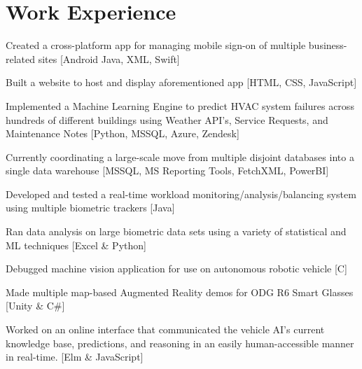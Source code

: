 \documentclass[letterpaper]{headers} %
\begin{document}
\begin{minipage}[t]{0.66\textwidth}

\section{Work Experience}

	\vspace{\topsep}
	\begin{tightitemize}
		\item Created a cross-platform app for managing mobile sign-on of multiple business-related sites [Android Java, XML, Swift]
		\item Built a website to host and display aforementioned app [HTML, CSS, JavaScript]
		\item Implemented a Machine Learning Engine to predict HVAC system failures across hundreds of different buildings using Weather API's, Service Requests, and Maintenance Notes [Python, MSSQL, Azure, Zendesk]
		\item Currently coordinating a large-scale move from multiple disjoint databases into a single data warehouse [MSSQL, MS Reporting Tools, FetchXML, PowerBI]
	\end{tightitemize}
	
	\sectionspace

	\begin{tightitemize}
		\item Developed and tested a real-time workload monitoring/analysis/balancing system using multiple biometric trackers [Java]
		\item Ran data analysis on large biometric data sets using a variety of statistical and ML techniques [Excel \& Python]
		\item Debugged machine vision application for use on autonomous robotic vehicle [C]
		\item Made multiple map-based Augmented Reality demos for ODG R6 Smart Glasses [Unity \& C\#]
		\item Worked on an online interface that communicated the vehicle AI's current knowledge base, predictions, and reasoning in an easily human-accessible manner in real-time. [Elm \& JavaScript]
	\end{tightitemize}
	

\end{minipage}
\end{document}
